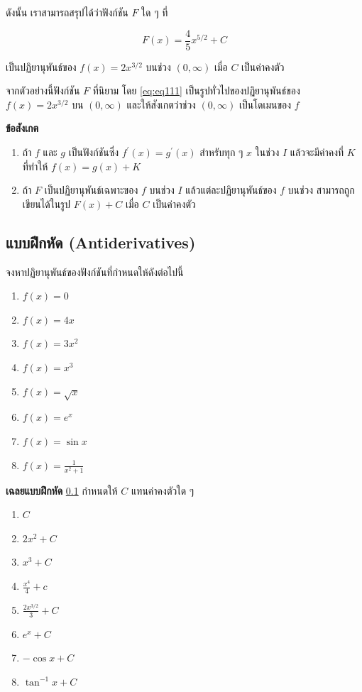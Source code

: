 \documentclass[
]{book}
\theoremstyle{definition}
\theoremstyle{definition}
\theoremstyle{definition}
\theoremstyle{definition}
\theoremstyle{remark}
\begin{document}
ดังนั้น เราสามารถสรุปได้ว่าฟังก์ชัน \(F\) ใด ๆ ที่

\begin{equation}
    F(x) = \frac{4}{5} x^{5/2} + C
    \label{eq:eq111}
\end{equation}

เป็นปฏิยานุพันธ์ของ \(f(x) = 2x^{3/2}\) บนช่วง \(\left( 0 ,\infty  \right)\) เมื่อ
\(C\) เป็นค่าคงตัว

จากตัวอย่างนี้ฟังก์ชัน \(F\) ที่นิยาม โดย \eqref{eq:eq111} เป็นรูปทั่วไปของปฏิยานุพันธ์ของ
\(f(x) = 2x^{3/2}\) บน \(\left( 0 ,\infty  \right)\) และให้สังเกตว่าช่วง
\(\left( 0
,\infty  \right)\) เป็นโดเมนของ \(f\)

\textbf{ข้อสังเกต}

\begin{enumerate}
\def\labelenumi{\arabic{enumi}.}
\item
  ถ้า \(f\) และ \(g\) เป็นฟังก์ชันซึ่ง \(f^{'}(x) = g^{'}(x)\) สำหรับทุก ๆ \(x\) ในช่วง
  \(I\) แล้วจะมีค่าคงที่ \(K\) ที่ทำให้ \(f(x) = g(x) + K\)
\item
  ถ้า \(F\) เป็นปฏิยานุพันธ์เฉพาะของ \(f\) บนช่วง \(I\) แล้วแต่ละปฏิยานุพันธ์ของ \(f\)
  บนช่วง สามารถถูกเขียนได้ในรูป \(F(x) + C\) เมื่อ \(C\) เป็นค่าคงตัว
\end{enumerate}

\subsection{แบบฝึกหัด (Antiderivatives)}\label{prob-anti}

จงหาปฏิยานุพันธ์ของฟังก์ชันที่กำหนดให้ดังต่อไปนี้

\begin{enumerate}
\def\labelenumi{\arabic{enumi}.}
\item
  \(f(x) = 0\)
\item
  \(f(x) = 4x\)
\item
  \(f(x) = 3x^{2 }\)
\item
  \(f(x) = x^{3}\)
\item
  \(f(x) = \sqrt{x}\)
\item
  \(f(x) = e^{x}\)
\item
  \(f(x) = \sin x\)
\item
  \(f(x) = \frac{1}{x^{2}+1}\)
\end{enumerate}

\textbf{เฉลยแบบฝึกหัด} \ref{prob-anti} กำหนดให้ \(C\) แทนค่าคงตัวใด ๆ

\begin{enumerate}
\def\labelenumi{\arabic{enumi}.}
\item
  \(C\)
\item
  \(2x^{2} + C\)
\item
  \(x^{3} + C\)
\item
  \(\displaystyle \frac{x^{4}}{4}+c\)
\item
  \(\displaystyle \frac{2x^{3/2}}{3} + C\)
\item
  \(e^{x} + C\)
\item
  \(-\cos x + C\)
\item
  \(\tan^{-1}x + C\)
\end{enumerate}
\end{document}
